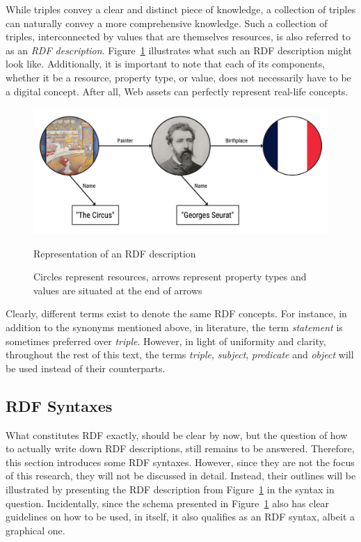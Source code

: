 While triples convey a clear and distinct piece of knowledge, a collection of triples can naturally convey a more comprehensive knowledge. Such a collection of triples, interconnected by values that are themselves resources, is also referred to as an \textit{RDF description}. Figure~\ref{fig:rdf_description} illustrates what such an RDF description might look like. Additionally, it is important to note that each of its components, whether it be a resource, property type, or value, does not necessarily have to be a digital concept. After all, Web assets can perfectly represent real-life concepts. \citep{miller1998introduction} \citep{candan2001resource}

\begin{figure}[htbp]
    \centering
	\includegraphics[width=\textwidth]{images/rdf_description.jpg}
	\caption{Representation of an RDF description}
    \caption*{Circles represent resources, arrows represent property types and values are situated at the end of arrows}
	\label{fig:rdf_description}
\end{figure}

Clearly, different terms exist to denote the same RDF concepts. For instance, in addition to the synonyms mentioned above, in literature, the term \textit{statement} is sometimes preferred over \textit{triple}. However, in light of uniformity and clarity, throughout the rest of this text, the terms \textit{triple}, \textit{subject}, \textit{predicate} and \textit{object} will be used instead of their counterparts. \citep{candan2001resource}

\subsection{RDF Syntaxes}
\label{subsec:rdf_syntax}

What constitutes RDF exactly, should be clear by now, but the question of how to actually write down RDF descriptions, still remains to be answered. Therefore, this section introduces some RDF syntaxes. However, since they are not the focus of this research, they will not be discussed in detail. Instead, their outlines will be illustrated by presenting the RDF description from Figure~\ref{fig:rdf_description} in the syntax in question. Incidentally, since the schema presented in Figure~\ref{fig:rdf_description} also has clear guidelines on how to be used, in itself, it also qualifies as an RDF syntax, albeit a graphical one. \citep{miller1998introduction}

